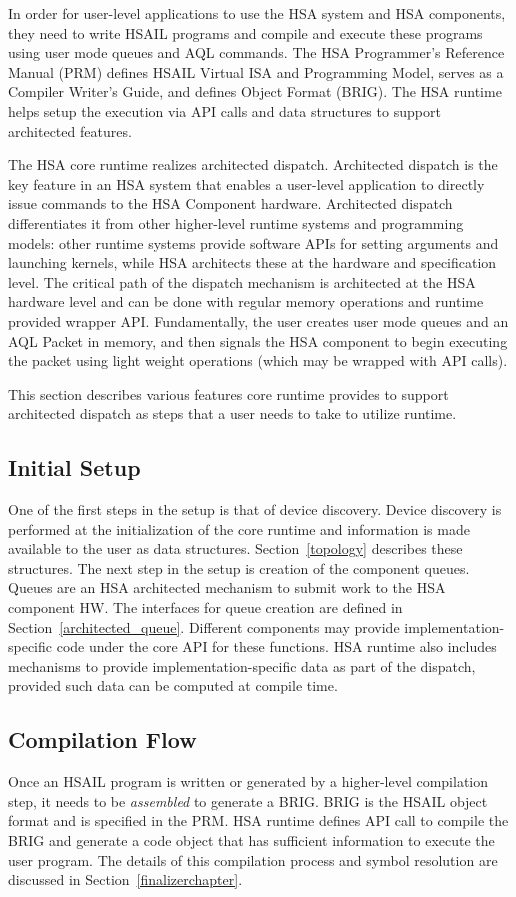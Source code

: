 In order for user-level applications to use the HSA system and HSA
components, they need to write HSAIL programs and compile and
execute these programs using user mode queues and AQL commands.  The
HSA Programmer’s Reference Manual (PRM) defines HSAIL Virtual ISA
and Programming Model, serves as a Compiler Writer’s Guide, and
defines Object Format (BRIG). The HSA runtime helps setup the
execution via API calls and data structures to support architected
features.

The HSA core runtime realizes architected dispatch. Architected
dispatch is the key feature in an HSA system that enables a
user-\/level application to directly issue commands to the HSA
Component hardware.  Architected dispatch differentiates it from
other higher-\/level runtime systems and programming models\-: other
runtime systems provide software A\-P\-Is for setting arguments and
launching kernels, while H\-S\-A architects these at the hardware
and specification level.  The critical path of the dispatch
mechanism is architected at the H\-S\-A hardware level and can be
done with regular memory operations and runtime provided wrapper
API.  Fundamentally, the user creates user mode queues and an
A\-Q\-L Packet in memory, and then signals the HSA component to
begin executing the packet using light weight operations (which may
be wrapped with A\-P\-I calls).

This section describes various features core runtime provides to
support architected dispatch as steps that a user needs to take to
utilize runtime.

\subsection{Initial Setup}
One of the first steps in the setup is that of device discovery.
Device discovery is performed at the initialization of the core
runtime and information is made available to the user as data
structures. Section~\ref{topology} describes these structures.
The next step in the setup is creation of the
component queues. Queues are an HSA architected mechanism to submit
work to the HSA component HW. The interfaces for queue creation 
are defined in Section~\ref{architected_queue}. Different
components may provide
implementation-\/specific code under the core A\-P\-I for these
functions. H\-S\-A runtime also includes mechanisms to provide
implementation-\/specific data as part of the dispatch, provided
such data can be computed at compile time. 

\subsection{Compilation Flow}
Once an HSAIL program is written or generated by a higher-level
compilation step, it needs to be \emph{assembled} to generate a
BRIG. BRIG is the HSAIL object format and is specified in the PRM. 
HSA runtime defines API call to compile the BRIG and generate a code
object that has sufficient information to execute the user
program. The details of this compilation process and symbol
resolution are discussed in Section~\ref{finalizerchapter}.

